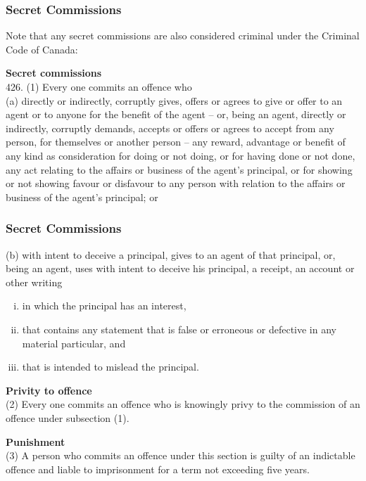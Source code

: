 \begin{frame}
\frametitle{Secret Commissions}

Note that any secret commissions are also considered criminal under the Criminal Code of Canada:

\textbf{Secret commissions}\\
426. (1) Every one commits an offence who\\
(a) directly or indirectly, corruptly gives, offers or agrees to give or offer to an agent or to anyone for the benefit of the agent  --  or, being an agent, directly or indirectly, corruptly demands, accepts or offers or agrees to accept from any person, for themselves or another person  --  any reward, advantage or benefit of any kind as consideration for doing or not doing, or for having done or not done, any act relating to the affairs or business of the agent's principal, or for showing or not showing favour or disfavour to any person with relation to the affairs or business of the agent's principal; or


\end{frame}



\begin{frame}
\frametitle{Secret Commissions}

(b) with intent to deceive a principal, gives to an agent of that principal, or, being an agent, uses with intent to deceive his principal, a receipt, an account or other writing
\begin{enumerate}[i)]
\item in which the principal has an interest,
\item that contains any statement that is false or erroneous or defective in any material particular, and
\item that is intended to mislead the principal.
\end{enumerate}

\textbf{Privity to offence}\\
(2) Every one commits an offence who is knowingly privy to the commission of an offence under subsection (1).

\textbf{Punishment}\\
(3) A person who commits an offence under this section is guilty of an indictable offence and liable to imprisonment for a term not exceeding five years.


\end{frame}



